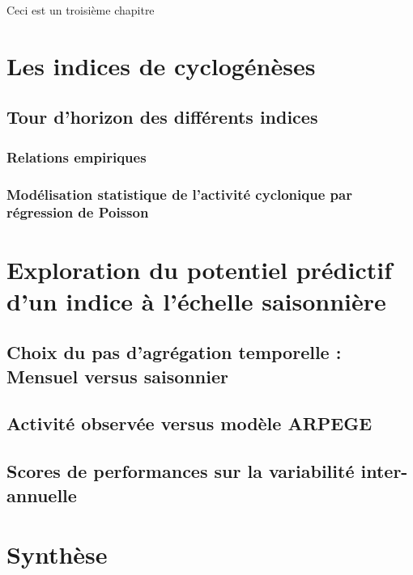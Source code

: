 \documentclass[../main.tex]{subfiles}
\begin{document}
\begin{itshape}
    Ceci est un troisième chapitre
\end{itshape}

\minitoc
\section{Les indices de cyclogénèses}

\subsection{Tour d'horizon des différents indices}

\subsubsection{Relations empiriques}

\subsubsection{Modélisation statistique de l'activité cyclonique par régression de Poisson}

\section{Exploration du potentiel prédictif d'un indice à l'échelle saisonnière}

\subsection{Choix du pas d'agrégation temporelle : Mensuel versus saisonnier}

\subsection{Activité observée versus modèle ARPEGE}

\subsection{Scores de performances sur la variabilité inter-annuelle}


\section{Synthèse}
\end{document}
